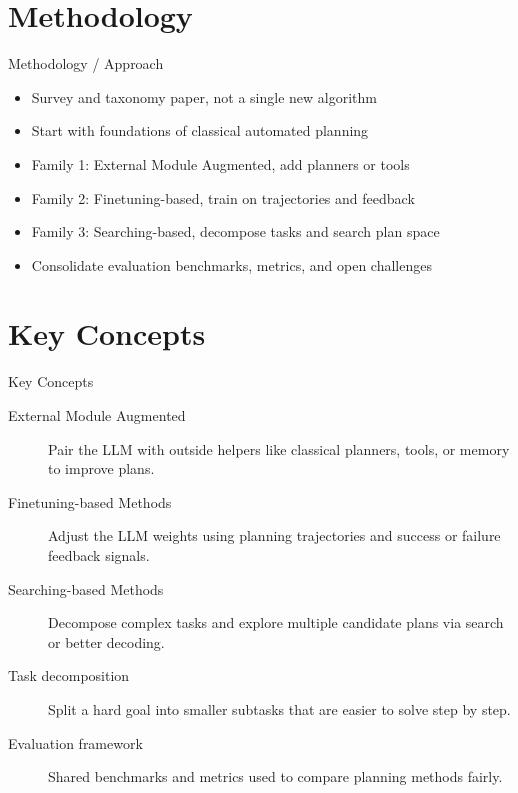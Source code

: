 \documentclass[10pt]{beamer}
\begin{document}
\section{Methodology}
\begin{frame}[allowframebreaks]{Methodology / Approach}
\begin{itemize}
  \item Survey and taxonomy paper, not a single new algorithm
  \item Start with foundations of classical automated planning
  \item Family 1: External Module Augmented, add planners or tools
  \item Family 2: Finetuning-based, train on trajectories and feedback
  \item Family 3: Searching-based, decompose tasks and search plan space
  \item Consolidate evaluation benchmarks, metrics, and open challenges
\end{itemize}
\end{frame}

\section{Key Concepts}
\begin{frame}[allowframebreaks]{Key Concepts}
  \begin{description}
    \item[External Module Augmented] Pair the LLM with outside helpers like classical planners, tools, or memory to improve plans.
    \item[Finetuning-based Methods] Adjust the LLM weights using planning trajectories and success or failure feedback signals.
    \item[Searching-based Methods] Decompose complex tasks and explore multiple candidate plans via search or better decoding.
    \item[Task decomposition] Split a hard goal into smaller subtasks that are easier to solve step by step.
    \item[Evaluation framework] Shared benchmarks and metrics used to compare planning methods fairly.
  \end{description}
\end{frame}
\end{document}
